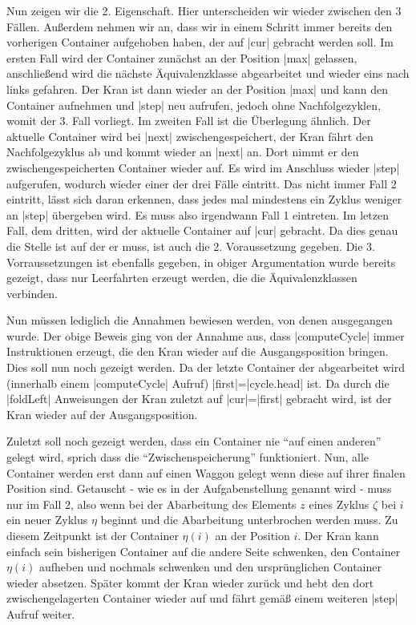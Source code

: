 Nun zeigen wir die 2. Eigenschaft. Hier unterscheiden wir wieder zwischen den 3 Fällen.
Außerdem nehmen wir an, dass wir in einem Schritt immer bereits den vorherigen Container aufgehoben haben, der auf |cur| gebracht werden soll.
Im ersten Fall wird der Container zunächst an der Position |max| gelassen, anschließend wird die nächste Äquivalenzklasse abgearbeitet und wieder eins nach links gefahren.
Der Kran ist dann wieder an der Position |max| und kann den Container aufnehmen und |step| neu aufrufen, jedoch ohne Nachfolgezyklen, womit der 3. Fall vorliegt.
Im zweiten Fall ist die Überlegung ähnlich. Der aktuelle Container wird bei |next| zwischengespeichert, der Kran fährt den Nachfolgezyklus ab und kommt wieder an |next| an.
Dort nimmt er den zwischengespeicherten Container wieder auf.
Es wird im Anschluss wieder |step| aufgerufen, wodurch wieder einer der drei Fälle eintritt.
Das nicht immer Fall 2 eintritt, lässt sich daran erkennen, dass jedes mal mindestens ein Zyklus weniger an |step| übergeben wird.
Es muss also irgendwann Fall 1 eintreten.
Im letzen Fall, dem dritten, wird der aktuelle Container auf |cur| gebracht.
Da dies genau die Stelle ist auf der er muss, ist auch die 2. Voraussetzung gegeben.
Die 3. Vorraussetzungen ist ebenfalls gegeben, in obiger Argumentation wurde bereits gezeigt, dass nur Leerfahrten erzeugt werden, die die Äquivalenzklassen verbinden.

Nun müssen lediglich die Annahmen bewiesen werden, von denen ausgegangen wurde.
Der obige Beweis ging von der Annahme aus, dass |computeCycle| immer Instruktionen erzeugt, die den Kran wieder auf die Ausgangsposition bringen.
Dies soll nun noch gezeigt werden. Da der letzte Container der abgearbeitet wird (innerhalb einem |computeCycle| Aufruf) |first|=|cycle.head| ist.
Da durch die |foldLeft| Anweisungen der Kran zuletzt auf |cur|=|first| gebracht wird, ist der Kran wieder auf der Ausgangsposition.

Zuletzt soll noch gezeigt werden, dass ein Container nie ``auf einen anderen'' gelegt wird, sprich dass die ``Zwischenspeicherung'' funktioniert.
Nun, alle Container werden erst dann auf einen Waggon gelegt wenn diese auf ihrer finalen Position sind.
Getauscht - wie es in der Aufgabenstellung genannt wird - muss nur im Fall 2,
also wenn bei der Abarbeitung des Elements $z$ eines Zyklus $\zeta$ bei $i$ ein neuer Zyklus $\eta$ beginnt und die Abarbeitung unterbrochen werden muss.
Zu diesem Zeitpunkt ist der Container $\eta(i)$ an der Position $i$. Der Kran kann einfach sein bisherigen Container auf die andere Seite schwenken, den Container $\eta(i)$
aufheben und nochmals schwenken und den ursprünglichen Container wieder absetzen.
Später kommt der Kran wieder zurück und hebt den dort zwischengelagerten Container wieder auf und fährt gemäß einem weiteren |step| Aufruf weiter.

